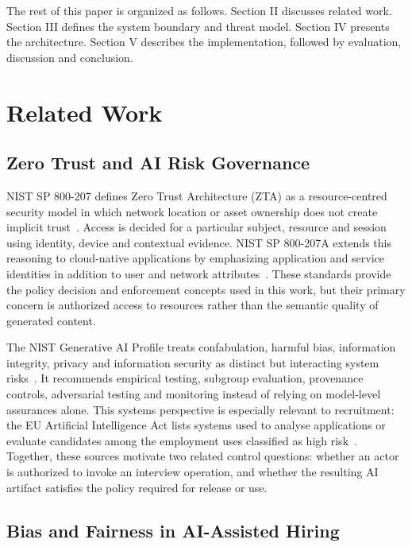\documentclass[conference]{IEEEtran}
\begin{document}
The rest of this paper is organized as follows. Section II discusses related work. Section III defines the system boundary and threat model. Section IV presents the architecture. Section V describes the implementation, followed by evaluation, discussion and conclusion.

\section{Related Work}

\subsection{Zero Trust and AI Risk Governance}

NIST SP 800-207 defines Zero Trust Architecture (ZTA) as a resource-centred security model in which network location or asset ownership does not create implicit trust~\cite{rose2020zero}. Access is decided for a particular subject, resource and session using identity, device and contextual evidence. NIST SP 800-207A extends this reasoning to cloud-native applications by emphasizing application and service identities in addition to user and network attributes~\cite{chandramouli2023zero}. These standards provide the policy decision and enforcement concepts used in this work, but their primary concern is authorized access to resources rather than the semantic quality of generated content.

The NIST Generative AI Profile treats confabulation, harmful bias, information integrity, privacy and information security as distinct but interacting system risks~\cite{nist2024genai}. It recommends empirical testing, subgroup evaluation, provenance controls, adversarial testing and monitoring instead of relying on model-level assurances alone. This systems perspective is especially relevant to recruitment: the EU Artificial Intelligence Act lists systems used to analyse applications or evaluate candidates among the employment uses classified as high risk~\cite{eu2024aiact}. Together, these sources motivate two related control questions: whether an actor is authorized to invoke an interview operation, and whether the resulting AI artifact satisfies the policy required for release or use.

\subsection{Bias and Fairness in AI-Assisted Hiring}
\end{document}
